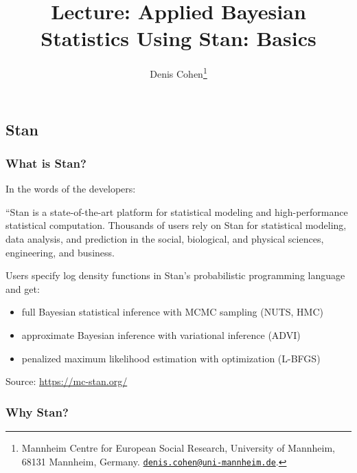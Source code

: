 \documentclass[
  11pt,
]{article}
\title{Lecture: Applied Bayesian Statistics Using Stan: Basics}
\author{Denis Cohen\footnote{Mannheim Centre for European Social Research, University of Mannheim, 68131 Mannheim, Germany. \href{mailto:denis.cohen@uni-mannheim.de}{\nolinkurl{denis.cohen@uni-mannheim.de}}.}}
\date{}
\providecommand{\tightlist}{%
  \setlength{\itemsep}{0pt}\setlength{\parskip}{0pt}}
\begin{document}
\maketitle

\hypertarget{stan}{%
\subsection{Stan}\label{stan}}

\hypertarget{what-is-stan}{%
\subsubsection{What is Stan?}\label{what-is-stan}}

In the words of the developers:

``Stan is a state-of-the-art platform for statistical modeling and high-performance statistical computation. Thousands of users rely on Stan for statistical modeling, data analysis, and prediction in the social, biological, and physical sciences, engineering, and business.

Users specify log density functions in Stan's probabilistic programming language and get:

\begin{itemize}
\tightlist
\item
  full Bayesian statistical inference with MCMC sampling (NUTS, HMC)
\item
  approximate Bayesian inference with variational inference (ADVI)
\item
  penalized maximum likelihood estimation with optimization (L-BFGS)
\end{itemize}

Source: \url{https://mc-stan.org/}

\hypertarget{why-stan}{%
\subsubsection{Why Stan?}\label{why-stan}}
\end{document}
